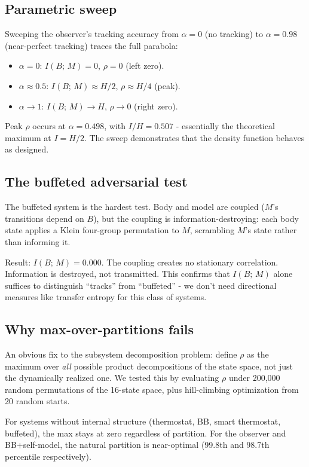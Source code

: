 \documentclass[12pt]{article}
\theoremstyle{remark}
\begin{document}
\subsection{Parametric sweep}

Sweeping the observer's tracking accuracy from $\alpha = 0$ (no tracking) to $\alpha = 0.98$ (near-perfect tracking) traces the full parabola:
\begin{itemize}[leftmargin=2em]
\item $\alpha = 0$: $I(B;\,M) = 0$, $\rho = 0$ (left zero).
\item $\alpha \approx 0.5$: $I(B;\,M) \approx H/2$, $\rho \approx H/4$ (peak).
\item $\alpha \to 1$: $I(B;\,M) \to H$, $\rho \to 0$ (right zero).
\end{itemize}
Peak $\rho$ occurs at $\alpha = 0.498$, with $I/H = 0.507$ - essentially the theoretical maximum at $I = H/2$. The sweep demonstrates that the density function behaves as designed.

\subsection{The buffeted adversarial test}

The buffeted system is the hardest test. Body and model are coupled ($M$'s transitions depend on $B$), but the coupling is information-destroying: each body state applies a Klein four-group permutation to $M$, scrambling $M$'s state rather than informing it.

Result: $I(B;\,M) = 0.000$. The coupling creates no stationary correlation. Information is destroyed, not transmitted. This confirms that $I(B;\,M)$ alone suffices to distinguish ``tracks'' from ``buffeted'' - we don't need directional measures like transfer entropy for this class of systems.

\subsection{Why max-over-partitions fails}\label{sec:max-partition}

An obvious fix to the subsystem decomposition problem: define $\rho$ as the maximum over \emph{all} possible product decompositions of the state space, not just the dynamically realized one. We tested this by evaluating $\rho$ under 200{,}000 random permutations of the 16-state space, plus hill-climbing optimization from 20 random starts.

For systems without internal structure (thermostat, BB, smart thermostat, buffeted), the max stays at zero regardless of partition. For the observer and BB+self-model, the natural partition is near-optimal (99.8th and 98.7th percentile respectively).
\end{document}
